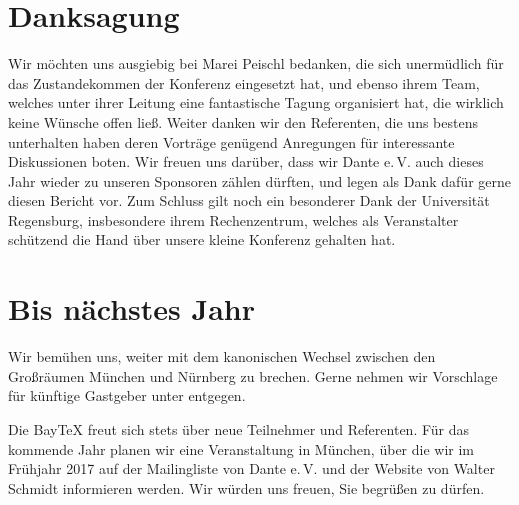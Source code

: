 \documentclass[ngerman]{dtk}
\begin{document}
\section{Danksagung}
Wir möchten uns ausgiebig bei Marei Peischl bedanken, die sich unermüdlich für das Zustandekommen der Konferenz
eingesetzt hat, und ebenso ihrem Team, welches unter ihrer Leitung eine fantastische Tagung organisiert hat,
die wirklich keine Wünsche offen ließ. Weiter danken wir den Referenten, die uns bestens unterhalten haben
deren Vorträge genügend Anregungen für interessante Diskussionen boten.
Wir freuen uns darüber, dass wir Dante e.\,V. auch dieses Jahr wieder zu unseren Sponsoren zählen dürften,
und legen als Dank dafür gerne diesen Bericht vor.
Zum Schluss gilt noch ein besonderer Dank der Universität Regensburg, insbesondere ihrem Rechenzentrum,
welches als Veranstalter schützend die Hand über unsere kleine Konferenz gehalten hat.

\section{Bis nächstes Jahr}
Wir bemühen uns, weiter mit dem kanonischen Wechsel zwischen den Großräumen München und Nürnberg zu brechen.
Gerne nehmen wir Vorschlage für künftige Gastgeber unter  entgegen.

Die Bay\TeX{} freut sich stets über neue Teilnehmer und Referenten.
Für das kommende Jahr planen wir eine Veranstaltung in München,
über die wir im Frühjahr 2017 auf der Mailingliste von Dante e.\,V.
und der Website von Walter Schmidt \cite{cq131a} informieren werden.
Wir würden uns freuen, Sie begrüßen zu dürfen.

\printbibliography
\end{document}
